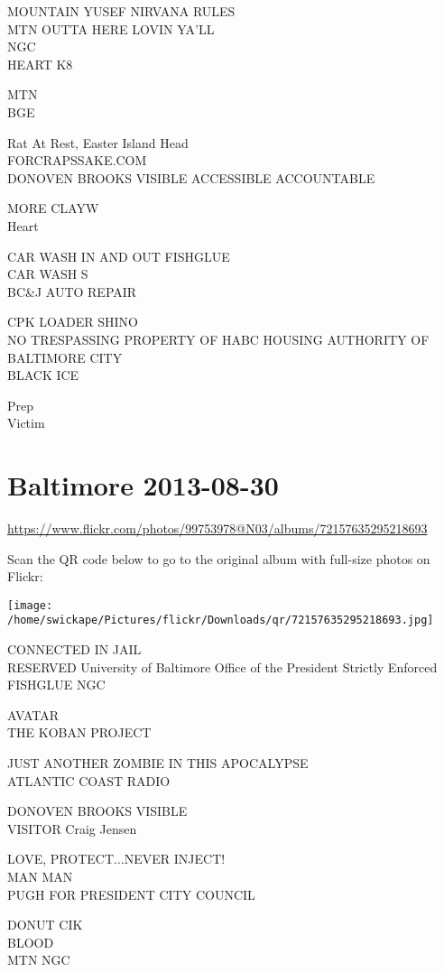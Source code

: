 \documentclass[10pt,letterpaper]{article}
\begin{document}
MOUNTAIN YUSEF NIRVANA RULES\\
MTN OUTTA HERE LOVIN YA'LL\\
NGC\\
HEART K8

MTN\\
BGE

Rat At Rest, Easter Island Head\\
FORCRAPSSAKE.COM\\
DONOVEN BROOKS VISIBLE ACCESSIBLE ACCOUNTABLE

MORE CLAYW\\
Heart

CAR WASH IN AND OUT FISHGLUE\\
CAR WASH S\\
BC\&J AUTO REPAIR

CPK LOADER SHINO\\
NO TRESPASSING PROPERTY OF HABC HOUSING AUTHORITY OF BALTIMORE CITY\\
BLACK ICE

Prep\\
Victim


\section*{Baltimore 2013-08-30}

\url{https://www.flickr.com/photos/99753978@N03/albums/72157635295218693}

Scan the QR code below to go to the original album with full-size photos on Flickr:

\texttt{[image: /home/swickape/Pictures/flickr/Downloads/qr/72157635295218693.jpg]}


CONNECTED IN JAIL\\
RESERVED University of Baltimore Office of the President Strictly Enforced FISHGLUE NGC

AVATAR\\
THE KOBAN PROJECT

JUST ANOTHER ZOMBIE IN THIS APOCALYPSE\\
ATLANTIC COAST RADIO

DONOVEN BROOKS VISIBLE\\
VISITOR Craig Jensen

LOVE, PROTECT...NEVER INJECT!\\
MAN MAN\\
PUGH FOR PRESIDENT CITY COUNCIL

DONUT CIK\\
BLOOD\\
MTN NGC
\end{document}
